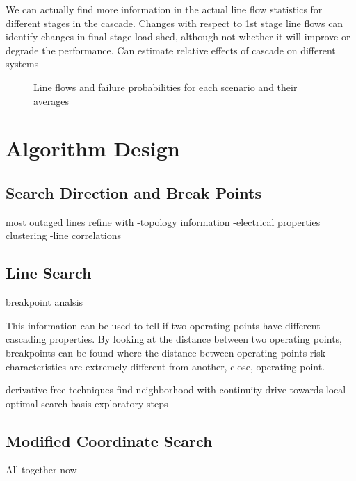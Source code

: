 We can actually find more information in the actual line flow statistics for different stages in the cascade.  Changes with respect to 1st stage line flows can identify changes in final stage load shed, although not whether it will improve or degrade the performance.
Can estimate relative effects of cascade on different systems
\begin{figure}
\centering
%
%
 \caption{Line flows and failure probabilities for each scenario and  their averages}
\label{fig:flows}
\end{figure}



\section{Algorithm Design}
\subsection{Search Direction and Break Points}
most outaged lines
refine with 	-topology information
		-electrical properties
clustering
		-line correlations
\subsection*{Line Search}
breakpoint analsis




This information can be used to tell if two operating points have different cascading properties.  By looking at the distance between two operating points, breakpoints can be found where the distance between operating points risk characteristics are extremely different from another, close, operating point.

derivative free techniques
find neighborhood with continuity
drive towards local optimal
search basis
exploratory steps

\subsection{Modified Coordinate Search}
All together now






